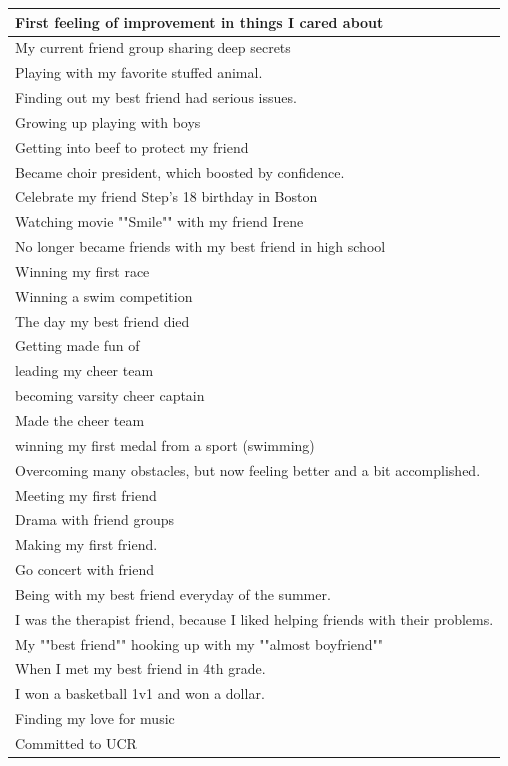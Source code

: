 \documentclass[
  .7em,
  letterpaper,
  DIV=11,
  numbers=noendperiod]{scrartcl}
\begin{document}
\begin{table}
\begin{tabular}{l}
\hline
First feeling of improvement in things I cared about\\
\hline
My current friend group sharing deep secrets\\
\hline
Playing with my favorite stuffed animal.\\
\hline
Finding out my best friend had serious issues.\\
\hline
Growing up playing with boys\\
\hline
Getting into beef to protect my friend\\
\hline
Became choir president, which boosted by confidence.\\
\hline
Celebrate my friend Step's 18 birthday in Boston\\
\hline
Watching movie ""Smile"" with my friend Irene\\
\hline
No longer became friends with my best friend in high school\\
\hline
Winning my first race\\
\hline
Winning a swim competition\\
\hline
The day my best friend died\\
\hline
Getting made fun of\\
\hline
leading my cheer team\\
\hline
becoming varsity cheer captain\\
\hline
Made the cheer team\\
\hline
winning my first medal from a sport (swimming)\\
\hline
Overcoming many obstacles, but now feeling better and a bit accomplished.\\
\hline
Meeting my first friend\\
\hline
Drama with friend groups\\
\hline
Making my first friend.\\
\hline
Go concert with friend\\
\hline
Being with my best friend everyday of the summer.\\
\hline
I was the therapist friend, because I liked helping friends with their problems.\\
\hline
My ""best friend"" hooking up with my ""almost boyfriend""\\
\hline
When I met my best friend in 4th grade.\\
\hline
I won a basketball 1v1 and won a dollar.\\
\hline
Finding my love for music\\
\hline
Committed to UCR\\

\end{tabular}
\end{table}
\end{document}
